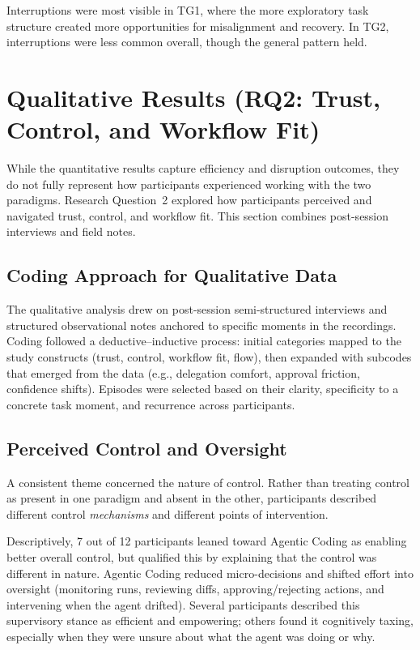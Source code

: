 Interruptions were most visible in TG1, where the more exploratory task structure created more opportunities for misalignment and recovery. In TG2, interruptions were less common overall, though the general pattern held.


\section{Qualitative Results (RQ2: Trust, Control, and Workflow Fit)}

While the quantitative results capture efficiency and disruption outcomes, they do not fully represent how participants experienced working with the two paradigms. Research Question~2 explored how participants perceived and navigated trust, control, and workflow fit. This section combines post-session interviews and field notes.

\subsection{Coding Approach for Qualitative Data}

The qualitative analysis drew on post-session semi-structured interviews and structured observational notes anchored to specific moments in the recordings. Coding followed a deductive--inductive process: initial categories mapped to the study constructs (trust, control, workflow fit, flow), then expanded with subcodes that emerged from the data (e.g., delegation comfort, approval friction, confidence shifts). Episodes were selected based on their clarity, specificity to a concrete task moment, and recurrence across participants.

\subsection{Perceived Control and Oversight}

A consistent theme concerned the nature of control. Rather than treating control as present in one paradigm and absent in the other, participants described different control \emph{mechanisms} and different points of intervention.

Descriptively, 7 out of 12 participants leaned toward Agentic Coding as enabling better overall control, but qualified this by explaining that the control was different in nature. Agentic Coding reduced micro-decisions and shifted effort into oversight (monitoring runs, reviewing diffs, approving/rejecting actions, and intervening when the agent drifted). Several participants described this supervisory stance as efficient and empowering; others found it cognitively taxing, especially when they were unsure about what the agent was doing or why.

